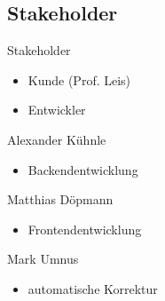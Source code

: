 \subsection{Stakeholder}

\begin{frame}{\insertsectionhead}
  \begin{block}{Stakeholder}
    \begin{itemize}
      \item Kunde (Prof. Leis)
      \item Entwickler
    \end{itemize}
  \end{block}

  \pause

  \begin{block}{Alexander Kühnle}
    \begin{itemize}
      \item Backendentwicklung
    \end{itemize}
  \end{block}
  
  \pause

  \begin{block}{Matthias Döpmann}
    \begin{itemize}
      \item Frontendentwicklung
    \end{itemize}
  \end{block}
  
  \pause

  \begin{block}{Mark Umnus}
    \begin{itemize}
      \item automatische Korrektur 
    \end{itemize}
  \end{block}
\end{frame}
